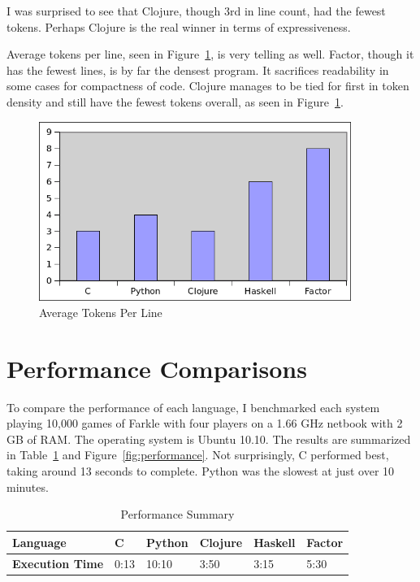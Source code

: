 \documentclass{article}
\begin{document}
I was surprised to see that Clojure, though 3rd in line count, had the fewest
tokens.  Perhaps Clojure is the real winner in terms of expressiveness.

Average tokens per line, seen in Figure~\ref{fig:averagetokens}, is very telling
as well.  Factor, though it has the fewest lines, is by far the densest program.
It sacrifices readability in some cases for compactness of code.  Clojure
manages to be tied for first in token density and still have the fewest tokens
overall, as seen in Figure~\ref{fig:averagetokens}.

\begin{figure}[h]
    \centering
    \includegraphics[width=4in]{graphs/average-tokens-per-line.png}
    \caption{Average Tokens Per Line \label{fig:averagetokens}}
\end{figure}

\section{Performance Comparisons}

To compare the performance of each language, I benchmarked each system playing
10,000 games of Farkle with four players on a 1.66 GHz netbook with 2 GB of RAM.
The operating system is Ubuntu 10.10.  The results are summarized in
Table~\ref{tab:performance} and Figure~\ref{fig:performance}.  Not surprisingly,
C performed best, taking around 13 seconds to complete.  Python was the slowest
at just over 10 minutes.

\begin{table}[h]
    \caption{Performance Summary \label{tab:performance}}
    \begin{tabular}{|p{1.2in}|p{0.3in}|p{0.5in}|p{0.5in}|p{0.5in}|p{0.5in}|}
        \hline
        {\bf Language} & {\bf C} & {\bf Python} & {\bf Clojure} & {\bf Haskell} & {\bf Factor} \\
        \hline
        {\bf Execution Time} & 0:13 & 10:10 & 3:50 & 3:15 & 5:30 \\
        \hline
    \end{tabular}
\end{table}
\end{document}
